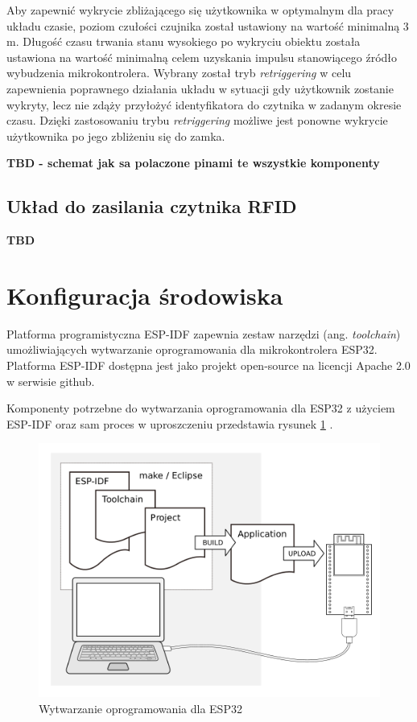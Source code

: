            Aby zapewnić wykrycie zbliżającego się użytkownika w optymalnym dla pracy układu czasie, poziom czułości czujnika został ustawiony na wartość minimalną 3 m. Długość czasu trwania stanu wysokiego po wykryciu obiektu została ustawiona na wartość minimalną celem uzyskania impulsu stanowiącego źródło wybudzenia mikrokontrolera. Wybrany został tryb \textit{retriggering} w celu zapewnienia poprawnego działania układu w sytuacji gdy użytkownik zostanie wykryty, lecz nie zdąży przyłożyć identyfikatora do czytnika w zadanym okresie czasu. Dzięki zastosowaniu trybu \textit{retriggering} możliwe jest ponowne wykrycie użytkownika po jego zbliżeniu się do zamka. 

            \textbf{TBD - schemat jak sa polaczone pinami te wszystkie komponenty}

        \subsection{Układ do zasilania czytnika RFID}

            \textbf{TBD}

    \section{Konfiguracja środowiska}

        Platforma programistyczna ESP-IDF zapewnia zestaw narzędzi (ang. \textit{toolchain}) umożliwiających wytwarzanie oprogramowania dla mikrokontrolera ESP32. Platforma ESP-IDF dostępna jest jako projekt open-source na licencji Apache 2.0 w serwisie github.

        Komponenty potrzebne do wytwarzania oprogramowania dla ESP32 z użyciem ESP-IDF oraz sam proces w uproszczeniu przedstawia rysunek \ref{fig:esp32_dev} \cite{esp-idf-get-started}.

        \begin{figure}[]
            \centering
            \includegraphics[width=\textwidth]{chapters/images/esp32_dev.png}
            \caption{Wytwarzanie oprogramowania dla ESP32}
            \label{fig:esp32_dev}
        \end{figure}

